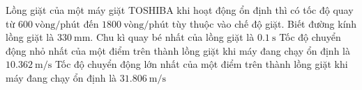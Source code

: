 \begin{ex}
	Lồng giặt của một máy giặt TOSHIBA khi hoạt động ổn định thì có tốc độ quay từ $\SI{600}{\text{vòng/phút}}$ đến $\SI{1800}{\text{vòng/phút}}$ tùy thuộc vào chế độ giặt. Biết đường kính lồng giặt là $\SI{330}{\milli\meter}$.
	{Chu kì quay bé nhất của lồng giặt là $\SI{0.1}{\second}$}
	{Tốc độ chuyển động nhỏ nhất của một điểm trên thành lồng giặt khi máy đang chạy ổn định là $\SI{10.362}{\meter/\second}$}
	{Tốc độ chuyển động lớn nhất của một điểm trên thành lồng giặt khi máy đang chạy ổn định là $\SI{31.806}{\meter/\second}$}
\end{ex}
